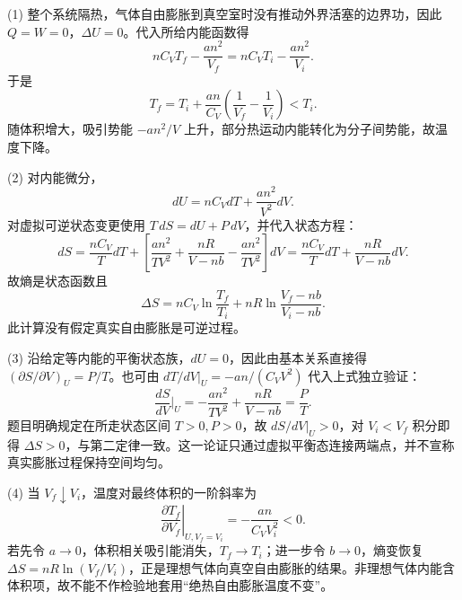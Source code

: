 (1) 整个系统隔热，气体自由膨胀到真空室时没有推动外界活塞的边界功，因此 \(Q=W=0\)，\(\Delta U=0\)。代入所给内能函数得
\[
nC_VT_f-\frac{an^2}{V_f}
=nC_VT_i-\frac{an^2}{V_i}.
\]
于是
\[
T_f=T_i+\frac{an}{C_V}\left(\frac1{V_f}-\frac1{V_i}\right)<T_i.
\]
随体积增大，吸引势能 \(-an^2/V\) 上升，部分热运动内能转化为分子间势能，故温度下降。

(2) 对内能微分，
\[
dU=nC_VdT+\frac{an^2}{V^2}dV.
\]
对虚拟可逆状态变更使用 \(T\,dS=dU+P\,dV\)，并代入状态方程：
\[
dS=\frac{nC_V}{T}dT+
\left[\frac{an^2}{TV^2}
+\frac{nR}{V-nb}-\frac{an^2}{TV^2}\right]dV
=\frac{nC_V}{T}dT+\frac{nR}{V-nb}dV.
\]
故熵是状态函数且
\[
\Delta S=nC_V\ln\frac{T_f}{T_i}
+nR\ln\frac{V_f-nb}{V_i-nb}.
\]
此计算没有假定真实自由膨胀是可逆过程。

(3) 沿给定等内能的平衡状态族，\(dU=0\)，因此由基本关系直接得 \((\partial S/\partial V)_U=P/T\)。也可由 \(dT/dV|_U=-an/(C_VV^2)\) 代入上式独立验证：
\[
\frac{dS}{dV}\bigg|_U=
-\frac{an^2}{TV^2}+\frac{nR}{V-nb}
=\frac PT.
\]
题目明确规定在所走状态区间 \(T>0,P>0\)，故 \(dS/dV|_U>0\)，对 \(V_i<V_f\) 积分即得 \(\Delta S>0\)，与第二定律一致。这一论证只通过虚拟平衡态连接两端点，并不宣称真实膨胀过程保持空间均匀。

(4) 当 \(V_f\downarrow V_i\)，温度对最终体积的一阶斜率为
\[
\left.\frac{\partial T_f}{\partial V_f}\right|_{U,V_f=V_i}
=-\frac{an}{C_VV_i^2}<0.
\]
若先令 \(a\to0\)，体积相关吸引能消失，\(T_f\to T_i\)；进一步令 \(b\to0\)，熵变恢复 \(\Delta S=nR\ln(V_f/V_i)\)，正是理想气体向真空自由膨胀的结果。非理想气体内能含体积项，故不能不作检验地套用“绝热自由膨胀温度不变”。
